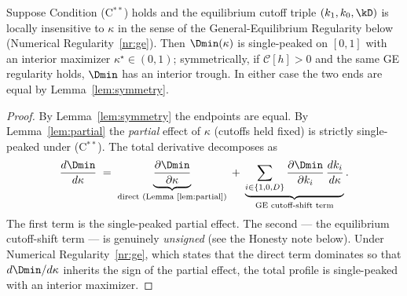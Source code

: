 \begin{proposition}
\label{prop:condhump}
Suppose Condition (C$^{\ast\ast}$) holds and the equilibrium cutoff triple
$(k_1,k_0,\kD)$ is locally insensitive to $\kappa$ in the sense of the
General-Equilibrium Regularity below (Numerical Regularity~\ref{nr:ge}).
Then $\Dmin(\kappa)$ is single-peaked on $[0,1]$ with an interior maximizer
$\kappa^{\star}\in(0,1)$; symmetrically, if $\mathcal{C}[h]>0$ and the same
GE regularity holds, $\Dmin$ has an interior trough. In either case the two
ends are equal by Lemma~\ref{lem:symmetry}.
\end{proposition}

\begin{proof}
By Lemma~\ref{lem:symmetry} the endpoints are equal. By
Lemma~\ref{lem:partial} the \emph{partial} effect of $\kappa$ (cutoffs held
fixed) is strictly single-peaked under (C$^{\ast\ast}$). The total
derivative decomposes as
\begin{equation}
  \label{eq:totalderiv}
  \frac{d\Dmin}{d\kappa}
  \;=\;
  \underbrace{\frac{\partial \Dmin}{\partial\kappa}}_{\text{direct (Lemma~\ref{lem:partial})}}
  \;+\;
  \underbrace{\sum_{i\in\{1,0,D\}}
    \frac{\partial \Dmin}{\partial k_i}\,\frac{dk_i}{d\kappa}}_{\text{GE cutoff-shift term}} .
\end{equation}
The first term is the single-peaked partial effect. The second --- the
equilibrium cutoff-shift term --- is genuinely \emph{unsigned} (see the
Honesty note below). Under Numerical Regularity~\ref{nr:ge}, which states
that the direct term dominates so that $d\Dmin/d\kappa$ inherits the sign of
the partial effect, the total profile is single-peaked with an interior
maximizer.
\end{proof}

